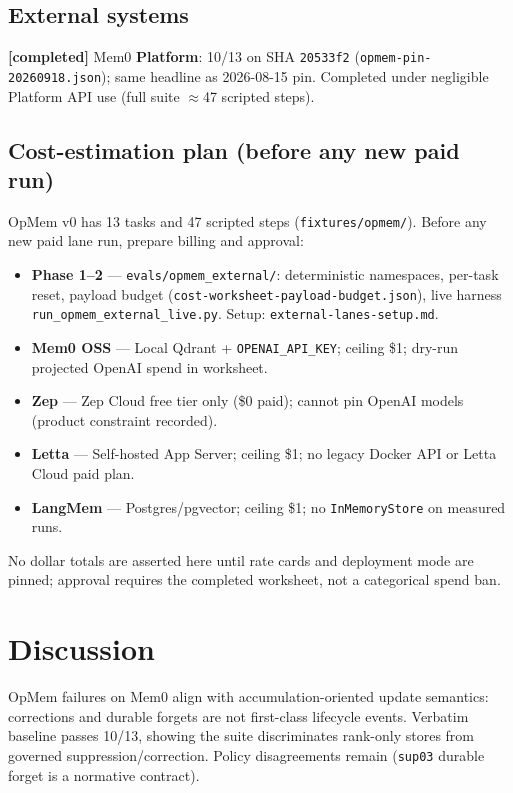 \documentclass[11pt]{article}
\newcommand{\evidence}[2]{\textbf{[#1]} #2}
\begin{document}
\subsection{External systems}
\label{sec:external}
\evidence{completed}{Mem0 \textbf{Platform}: 10/13 on SHA \texttt{20533f2} (\texttt{opmem-pin-20260918.json}); same headline as 2026-08-15 pin. Completed under negligible Platform API use (full suite $\approx$47 scripted steps).}


\subsection{Cost-estimation plan (before any new paid run)}
\label{sec:cost-plan}
OpMem v0 has 13 tasks and 47 scripted steps (\texttt{fixtures/opmem/}). Before any new paid lane run, prepare billing and approval:
\begin{itemize}
\item \textbf{Phase 1--2} --- \texttt{evals/opmem\_external/}: deterministic namespaces, per-task reset, payload budget (\texttt{cost-worksheet-payload-budget.json}), live harness \texttt{run\_opmem\_external\_live.py}. Setup: \texttt{external-lanes-setup.md}.
\item \textbf{Mem0 OSS} --- Local Qdrant + \texttt{OPENAI\_API\_KEY}; ceiling \$1; dry-run projected OpenAI spend in worksheet.
\item \textbf{Zep} --- Zep Cloud free tier only (\$0 paid); cannot pin OpenAI models (product constraint recorded).
\item \textbf{Letta} --- Self-hosted App Server; ceiling \$1; no legacy Docker API or Letta Cloud paid plan.
\item \textbf{LangMem} --- Postgres/pgvector; ceiling \$1; no \texttt{InMemoryStore} on measured runs.
\end{itemize}
No dollar totals are asserted here until rate cards and deployment mode are pinned; approval requires the completed worksheet, not a categorical spend ban.

\section{Discussion}
OpMem failures on Mem0 align with accumulation-oriented update semantics:
corrections and durable forgets are not first-class lifecycle events.
Verbatim baseline passes 10/13, showing the suite discriminates rank-only stores from
governed suppression/correction.
Policy disagreements remain (\texttt{sup03} durable forget is a normative contract).
\end{document}
